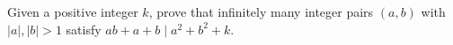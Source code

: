 Given a positive integer $k$, prove that infinitely many integer pairs $(a,b)$ with $|a|,|b|>1$ satisfy $ab+a+b\mid a^2+b^2+k$.
